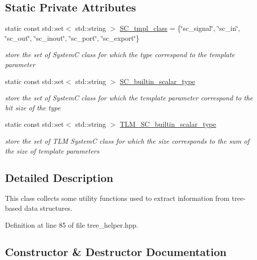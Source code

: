 \subsection*{Static Private Attributes}
\begin{DoxyCompactItemize}
\item 
static const std\+::set$<$ std\+::string $>$ \hyperlink{classtree__helper_a2ebb2e67cfdb16aa7f9e026c966e4b45}{S\+C\+\_\+tmpl\+\_\+class} = \{\char`\"{}sc\+\_\+signal\char`\"{}, \char`\"{}sc\+\_\+in\char`\"{}, \char`\"{}sc\+\_\+out\char`\"{}, \char`\"{}sc\+\_\+inout\char`\"{}, \char`\"{}sc\+\_\+port\char`\"{}, \char`\"{}sc\+\_\+export\char`\"{}\}
\begin{DoxyCompactList}\small\item\em store the set of SystemC class for which the type correspond to the template parameter \end{DoxyCompactList}\item 
static const std\+::set$<$ std\+::string $>$ \hyperlink{classtree__helper_a958fe44cf137dec46b3201954a839355}{S\+C\+\_\+builtin\+\_\+scalar\+\_\+type}
\begin{DoxyCompactList}\small\item\em store the set of SystemC class for which the template parameter correspond to the bit size of the type \end{DoxyCompactList}\item 
static const std\+::set$<$ std\+::string $>$ \hyperlink{classtree__helper_a69599ec0d76a65a522d54e00ccdca29c}{T\+L\+M\+\_\+\+S\+C\+\_\+builtin\+\_\+scalar\+\_\+type}
\begin{DoxyCompactList}\small\item\em store the set of T\+LM SystemC class for which the size corresponds to the sum of the size of template parameters \end{DoxyCompactList}\end{DoxyCompactItemize}


\subsection{Detailed Description}
This class collects some utility functions used to extract information from tree-\/based data structures. 

Definition at line 85 of file tree\+\_\+helper.\+hpp.



\subsection{Constructor \& Destructor Documentation}
\mbox{\label{classtree__helper_ab6ec2ef34b9c0fdb5ee4f14e2bf8ad90}} 
